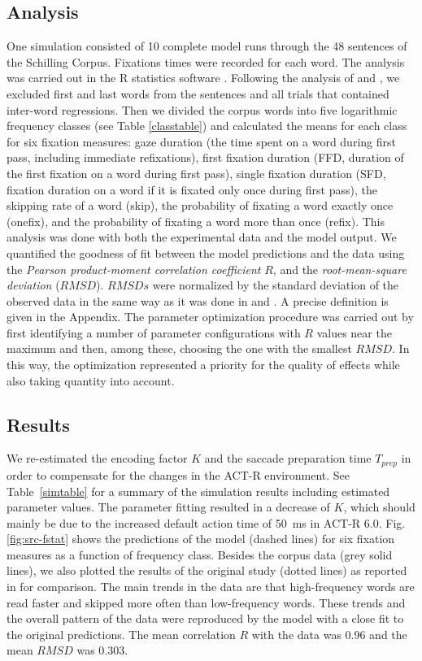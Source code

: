 \subsection{Analysis}
One simulation consisted of 10 complete model runs through the 48 sentences of the Schilling Corpus.  Fixations times were recorded for each word.  The analysis was carried out in the R{} statistics software \cite{R2012}.  Following the analysis of \cite{Reichle1998} and \cite{Salvucci2001}, we excluded first and last words from the sentences and all trials that contained inter-word regressions. Then we divided the corpus words into five logarithmic frequency classes (see Table \ref{classtable}) and calculated the means for each class for six fixation measures: gaze duration (the time spent on a word during first pass, including immediate refixations), first fixation duration (FFD, duration of the first fixation on a word during first pass), single fixation duration (SFD, fixation duration on a word if it is fixated only once during first pass), the skipping rate of a word (skip), the probability of fixating a word exactly once (onefix), and the probability of fixating a word more than once (refix).  This analysis was done with both the experimental data and the model output.
We quantified the goodness of fit between the model predictions and the data using the  \emph{Pearson product-moment correlation coefficient} $R$, and the  \emph{root-mean-square deviation} ($RMSD$).  $RMSDs$ were normalized by the standard deviation of the observed data in the same way as it was done in \cite{Reichle1998} and \cite{Salvucci2001}.  A precise definition is given in the Appendix.
The parameter optimization procedure was carried out by first identifying a number of parameter configurations with $R$ values near the maximum and then, among these, choosing the one with the smallest $RMSD$.  In this way, the optimization represented a priority for the quality of effects while also taking quantity into account.

\subsection{Results}
We re-estimated the encoding factor $K$ and the saccade preparation time $T_{prep}$ in order to compensate for the changes in the ACT-R environment.  See Table~\ref{simtable} for a summary of the simulation results including estimated parameter values.  
The parameter fitting resulted in a decrease of $K$, which should mainly be due to the increased default action time of 50~ms in ACT-R 6.0.
Fig. \ref{fig:src-fstat} shows the predictions of the model (dashed lines) for six fixation measures as a function of frequency class.  Besides the corpus data (grey solid lines), we also plotted the results of the original study (dotted lines) as reported in \cite{Salvucci2001} for comparison.
The main trends in the data are that high-frequency words are read faster and skipped more often than low-frequency words. These trends and the overall pattern of the data were reproduced by the model with a close fit to the original predictions. The mean correlation $R$ with the data was 0.96 and the mean $RMSD$ was 0.303.

